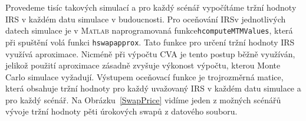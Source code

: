 \documentclass[a4paper,12pt]{report}
\theoremstyle{definition} \newtheorem{definice}[veta]{Definice}
\theoremstyle{remark}
\newcommand{\MATLAB}{\textsc{Matlab}\xspace}
\begin{document}
Provedeme tisíc takových simulací 
a pro každý scénář vypočítáme tržní hodnoty IRS v každém datu simulace v budoucnosti.
Pro oceňování IRS\linebreak v jednotlivých datech simulace je v \MATLAB naprogramovaná funkce\linebreak \verb+hcomputeMTMValues+, která při spuštění volá funkci \verb+hswapapprox+. 
Tato funkce pro určení tržní hodnoty IRS využívá aproximace. %
Nicméně při výpočtu CVA je tento postup běžně využíván, jelikož použití aproximace zásadně zvyšuje výkonost výpočtu, kterou  Monte Carlo simulace vyžadují.  
Výstupem oceňovací funkce je trojrozměrná matice, která obsahuje tržní hodnoty pro každý uvažovaný IRS v každém datu simulace a pro každý scénář. 
Na Obrázku~\ref{SwapPrice} vidíme jeden z možných scénářů vývoje tržní hodnoty pěti úrokových swapů z datového souboru.
\end{document}
